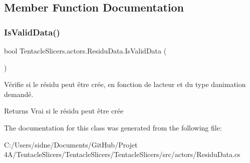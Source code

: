 \subsection{Member Function Documentation}
\mbox{\label{class_tentacle_slicers_1_1actors_1_1_residu_data_a210a14ceb5de1859a2d3c225446b37ff}} 
\subsubsection{\texorpdfstring{Is\+Valid\+Data()}{IsValidData()}}
{\footnotesize\ttfamily bool Tentacle\+Slicers.\+actors.\+Residu\+Data.\+Is\+Valid\+Data (\begin{DoxyParamCaption}{ }\end{DoxyParamCaption})}



Vérifie si le résidu peut être crée, en fonction de l\textquotesingle{}acteur et du type d\textquotesingle{}animation demandé. 

\begin{DoxyReturn}{Returns}
Vrai si le résidu peut être crée 
\end{DoxyReturn}


The documentation for this class was generated from the following file\+:\begin{DoxyCompactItemize}
\item 
C\+:/\+Users/sidne/\+Documents/\+Git\+Hub/\+Projet 4\+A/\+Tentacle\+Slicers/\+Tentacle\+Slicers/\+Tentacle\+Slicers/src/actors/Residu\+Data.\+cs\end{DoxyCompactItemize}

